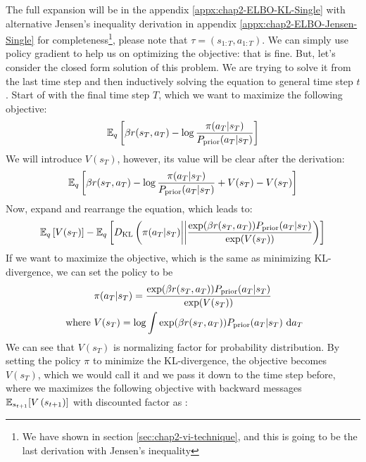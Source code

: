 The full expansion will be in the appendix \ref{appx:chap2-ELBO-KL-Single} with alternative Jensen's inequality derivation in appendix \ref{appx:chap2-ELBO-Jensen-Single} for completeness\footnote{We have shown in section \ref{sec:chap2-vi-technique}, and this is going to be the last derivation with Jensen's inequality}, please note that $\tau = (s_{1:T}, a_{1:T})$. 
We can simply use policy gradient to help us on optimizing the objective: that is fine. But, let's consider the closed form solution of this problem. We are trying to solve it from the last time step and then inductively solving the equation to general time step $t$. Start of with the final time step $T$, which we want to maximize the following objective:
\begin{equation}
    \mathbb{E}_{q} \left[\beta r(s_T, a_T) - \log \frac{\pi(a_T | s_T)}{P_{\text{prior}}(a_T | s_T)}\right]
\end{equation}
We will introduce $V(s_T)$, however, its value will be clear after the derivation: 
\begin{equation}
    \mathbb{E}_{q} \left[\beta r(s_T, a_T) - \log \frac{\pi(a_T | s_T)}{P_{\text{prior}}(a_T | s_T)} + V(s_T) - V(s_T) \right]
\end{equation}
Now, expand and rearrange the equation, which leads to:
\begin{equation}
    \mathbb{E}_q \left[ V(s_T) \right] - \mathbb{E}_q \left[ D_{\mathrm{KL}}\left( \pi(a_T | s_T) \bigg|\bigg| \frac{\exp(\beta r(s_T, a_T)) P_{\text{prior}}(a_T | s_T)}{\exp(V(s_T))} \right) \right]
\end{equation}
If we want to maximize the objective, which is the same as minimizing KL-divergence, we can set the policy to be 
\begin{equation}
    \label{eqn:chap2-soln-policy-terminal}
\begin{aligned}
    &\pi(a_T | s_T) = \frac{\exp(\beta r(s_T, a_T)) P_{\text{prior}}(a_T | s_T)}{\exp(V(s_T))} \\
    \text{ where }& V(s_T) = \log \int \exp(\beta r(s_T, a_T)) P_{\text{prior}}(a_T | s_T) \ \mathrm{d} a_T
\end{aligned}
\end{equation}
We can see that $V(s_T)$ is normalizing factor for probability distribution. By setting the policy $\pi$ to minimize the KL-divergence, the objective becomes $V(s_T)$, which we would call it  and we pass it down to the time step before, where we maximizes the following objective with backward messages $\mathbb{E}_{s_{t+1}}[V\left( s_{t+1} \right)]$ with discounted factor as :
